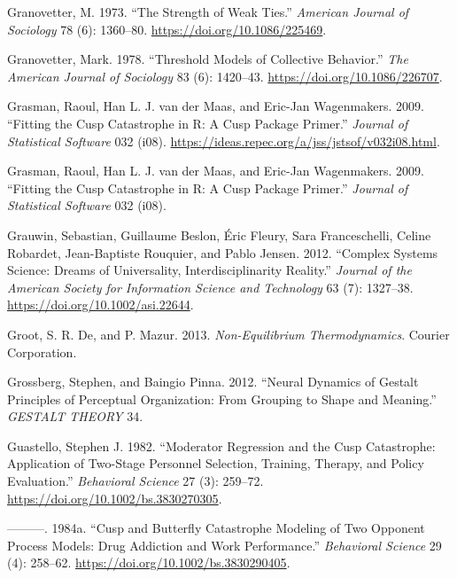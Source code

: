 \documentclass[
  a4paper,
  DIV=11,
  numbers=noendperiod]{scrreprt}
\newlength{\cslhangindent}
\newlength{\cslentryspacingunit} %
\newenvironment{CSLReferences}[2] %
 {%
  \setlength{\parindent}{0pt}
  \ifodd #1
  \let\oldpar\par
  \def\par{\hangindent=\cslhangindent\oldpar}
  \fi
  \setlength{\parskip}{#2\cslentryspacingunit}
 }%
 {}
\begin{document}
\begin{CSLReferences}{1}{0}
\leavevmode{}%
Granovetter, M. 1973. {``The Strength of Weak Ties.''} \emph{American
Journal of Sociology} 78 (6): 1360--80.
\url{https://doi.org/10.1086/225469}.

\leavevmode{}%
Granovetter, Mark. 1978. {``Threshold {Models} of {Collective
Behavior}.''} \emph{The American Journal of Sociology} 83 (6): 1420--43.
\url{https://doi.org/10.1086/226707}.

\leavevmode{}%
Grasman, Raoul, Han L. J. van der Maas, and Eric-Jan Wagenmakers. 2009.
{``Fitting the Cusp Catastrophe in R: A Cusp Package Primer.''}
\emph{Journal of Statistical Software} 032 (i08).
\url{https://ideas.repec.org/a/jss/jstsof/v032i08.html}.

\leavevmode{}%
Grasman, Raoul, Han L. J. van der Maas, and Eric-Jan Wagenmakers. 2009.
{``Fitting the {Cusp Catastrophe} in {R}: {A} Cusp {Package Primer}.''}
\emph{Journal of Statistical Software} 032 (i08).

\leavevmode{}%
Grauwin, Sebastian, Guillaume Beslon, Éric Fleury, Sara Franceschelli,
Celine Robardet, Jean-Baptiste Rouquier, and Pablo Jensen. 2012.
{``Complex Systems Science: {Dreams} of Universality,
Interdisciplinarity Reality.''} \emph{Journal of the American Society
for Information Science and Technology} 63 (7): 1327--38.
\url{https://doi.org/10.1002/asi.22644}.

\leavevmode{}%
Groot, S. R. De, and P. Mazur. 2013. \emph{Non-Equilibrium
Thermodynamics}. Courier Corporation.

\leavevmode{}%
Grossberg, Stephen, and Baingio Pinna. 2012. {``Neural {Dynamics} of
{Gestalt Principles} of {Perceptual Organization}: {From Grouping} to
{Shape} and {Meaning}.''} \emph{GESTALT THEORY} 34.

\leavevmode{}%
Guastello, Stephen J. 1982. {``Moderator Regression and the Cusp
Catastrophe: {Application} of Two-Stage Personnel Selection, Training,
Therapy, and Policy Evaluation.''} \emph{Behavioral Science} 27 (3):
259--72. \url{https://doi.org/10.1002/bs.3830270305}.

\leavevmode{}%
---------. 1984a. {``Cusp and Butterfly Catastrophe Modeling of Two
Opponent Process Models: {Drug} Addiction and Work Performance.''}
\emph{Behavioral Science} 29 (4): 258--62.
\url{https://doi.org/10.1002/bs.3830290405}.


\end{CSLReferences}
\end{document}
